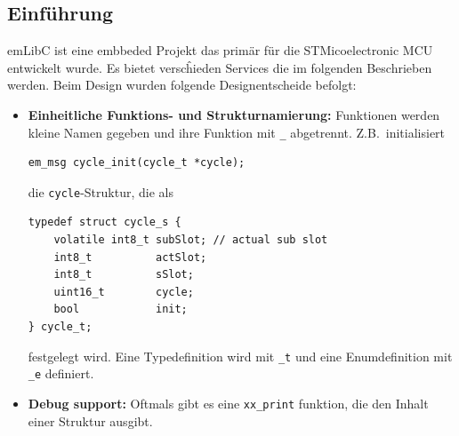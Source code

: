 \subsection{Einführung}
emLibC ist eine embbeded Projekt das primär für die  STMicoelectronic MCU entwickelt wurde. Es bietet verscĥieden Services die im folgenden Beschrieben werden. Beim Design wurden folgende Designentscheide befolgt:
\begin{itemize}
\item {\bf Einheitliche Funktions- und Strukturnamierung:} Funktionen werden kleine Namen gegeben und ihre Funktion mit \verb|_| abgetrennt. Z.B.\ initialisiert
\begin{verbatim}
em_msg cycle_init(cycle_t *cycle);
\end{verbatim}
die \verb|cycle|-Struktur, die als
\begin{verbatim}
typedef struct cycle_s {
    volatile int8_t subSlot; // actual sub slot
    int8_t          actSlot;
    int8_t          sSlot;
    uint16_t        cycle;
    bool            init;
} cycle_t;
\end{verbatim}
festgelegt wird. Eine Typedefinition wird mit \verb|_t| und eine Enumdefinition mit \verb|_e| definiert.
\item {\bf Debug support:} Oftmals gibt es eine \verb|xx_print| funktion, die den Inhalt einer Struktur ausgibt.
\end{itemize}
